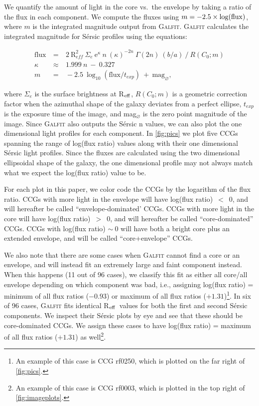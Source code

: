 \documentclass[iop,apj]{emulateapj}
\newcommand{\Reff}{R$_{\rm eff}$}
\begin{document}
We quantify the amount of light in the core vs.~the envelope by taking a ratio of the flux in each component. We compute the fluxes using $m = -2.5 \times \log({\rm flux})$, where $m$ is the integrated magnitude output from \textsc{Galfit}. \textsc{Galfit} calculates the integrated magnitude for S\'ersic profiles using the equations:

\begin{eqnarray}
\text{flux}~&=&~2~\text{R}_{eff}^2~\Sigma_e~\text{e}^{\kappa}~n~(\kappa)^{-2n}~\Gamma(2n)~(b/a)~/~R(C_0; m) \\
\kappa~&\approx&~1.999~n~-~0.327\\
m~&=&~-2.5~\log_{10}(\text{flux}/t_{exp})~+~\text{mag}_{\varnothing},
\end{eqnarray}

where $\Sigma_e$ is the surface brightness at \Reff, $R(C_0; m)$ is a geometric correction factor when the azimuthal shape of the galaxy deviates from a perfect ellipse, $t_{exp}$ is the exposure time of the image, and mag$_{\varnothing}$ is the zero point magnitude of the image. Since \textsc{Galfit} also outputs the S\'ersic n values, we can also plot the one dimensional light profiles for each component. In \autoref{fig:pics} we plot five CCGs spanning the range of log(flux ratio) values along with their one dimensional S\'ersic light profiles. Since the fluxes are calculated using the two dimensional ellipsoidal shape of the galaxy, the one dimensional profile may not always match what we expect the log(flux ratio) value to be.

For each plot in this paper, we color code the CCGs by the logarithm of the flux ratio. CCGs with more light in the envelope will have log(flux ratio)~$<$~0, and will hereafter be called ``envelope-dominated' CCGs. CCGs with more light in the core will have log(flux ratio)~$>$~0, and will hereafter be called ``core-dominated'' CCGs. CCGs with log(flux ratio) $\sim~0$ will have both a bright core plus an extended envelope, and will be called ``core+envelope'' CCGs.

We also note that there are some cases when \textsc{Galfit} cannot find a core or an envelope, and will instead fit an extremely large and faint component instead. When this happens (11 out of 96 cases), we classify this fit as either all core/all envelope depending on which component was bad, i.e., assigning log(flux ratio) = minimum of all flux ratios ($-0.93$) or maximum of all flux ratios ($+1.31$)\footnote{An example of this case is CCG rf0250, which is plotted on the far right of \autoref{fig:pics}.}. In six of 96 cases, \textsc{Galfit} fits identical \Reff\ values for both the first and second S\'ersic components. We inspect their S\'ersic plots by eye and see that these should be core-dominated CCGs. We assign these cases to have log(flux ratio) = maximum of all flux ratios ($+1.31$) as well\footnote{An example of this case is CCG rf0003, which is plotted in the top right of \autoref{fig:imageplots}.}.
\end{document}
